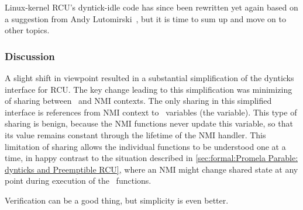 \QuickQuizEnd

Linux-kernel RCU's dyntick-idle code has since been rewritten yet again
based on a suggestion from
Andy Lutomirski~\cite{PaulMcKenney2015dyntickAndyNMI},
but it is time to sum up and move on to other topics.

\subsubsection{Discussion}
\label{sec:formal:Discussion}

A slight shift in viewpoint resulted in a substantial simplification
of the dynticks interface for RCU\@.
The key change leading to this simplification was minimizing of
sharing between \IRQ\ and NMI contexts.
The only sharing in this simplified interface is references from NMI
context to \IRQ\ variables (the  variable).
This type of sharing is benign, because the NMI functions never update
this variable, so that its value remains constant through the lifetime
of the NMI handler.
This limitation of sharing allows the individual functions to be
understood one at a time, in happy contrast to the situation
described in
\cref{sec:formal:Promela Parable: dynticks and Preemptible RCU},
where an NMI might change shared state at any point during execution of
the \IRQ\ functions.

Verification can be a good thing, but simplicity is even better.

